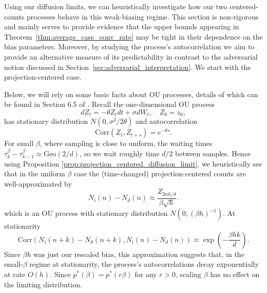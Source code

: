 Using our diffusion limits, we can heuristically investigate how our two centered-counts
 processes behave in this weak-biasing regime. This section is non-rigorous and mainly serves to 
 provide evidence that the upper bounds appearing in Theorem~\ref{thm:average_case_conv_rate} may be tight 
 in their dependence on the bias parameters. Moreover, 
 by studying the process's autocorrelation we aim to provide an alternative measure of its predictability 
 in contrast to the adversarial notion discussed in Section~\ref{sec:adversarial_interpretation}. 
 We start with the projection-centered case.

Below, we will rely on some basic facts about OU processes, details of which can be found in Section 
6.5 of \cite{risken1996_fokker_planck_equation}. Recall the one-dimensional OU process
%
\[dZ_t = -\theta Z_t dt + \sigma dW_t, \quad Z_0 = z_0,\]
%
\noindent has stationary distribution $N(0, \sigma^2/2\theta)$ and autocorrelation
%
\[\mathrm{Corr}(Z_t, Z_{t+s}) = e^{-\theta s}.\]
%
\noindent For small $\beta$, where sampling is close to uniform, the waiting times $\tau^\beta_k - \tau_{k-1}^\beta \approx \mathrm{Geo}(2/d)$, so we wait roughly time $d/2$ between samples. Hence using Proposition \ref{prop:projection_centered_diffusion_limit}, we heuristically see that in the uniform $\beta$ case the (time-changed) projection-centered counts are well-approximated by
    \[N_i(n) - N_d(n) \approx \frac{Z_{2nh/d}}{\beta\sqrt{h}}.\]
%
\noindent which is an OU process with stationary distribution $N(0, (\beta h)^{-1})$. At stationarity
%
\[\mathrm{Corr}(N_i(n+k) -  N_d(n+k), N_i(n) -  N_d(n)) \approx \exp\left(-\frac{\beta hk}{d}\right). \]
%
\noindent Since $\beta h$ was just our rescaled bias, this approximation suggests that, in the 
small-$\beta$ regime at stationarity, the process's autocorrelations decay exponentially 
at rate $O(h)$. Since $p^*(\beta) = p^*(r\beta)$ for any $r > 0$, scaling $\beta$ has no 
effect on the limiting distribution.

